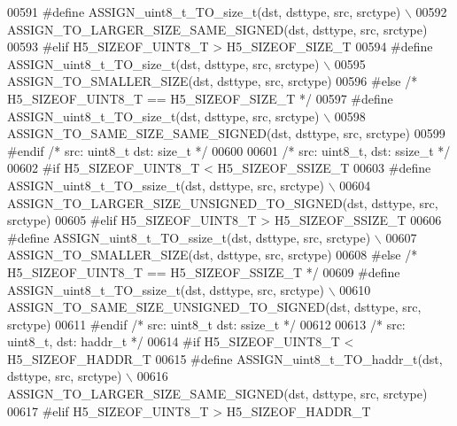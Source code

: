 \begin{DoxyCode}
00591 \textcolor{preprocessor}{    #define ASSIGN\_uint8\_t\_TO\_size\_t(dst, dsttype, src, srctype) \(\backslash\)}
00592 \textcolor{preprocessor}{        ASSIGN\_TO\_LARGER\_SIZE\_SAME\_SIGNED(dst, dsttype, src, srctype)}
00593 \textcolor{preprocessor}{#elif H5\_SIZEOF\_UINT8\_T > H5\_SIZEOF\_SIZE\_T}
00594 \textcolor{preprocessor}{    #define ASSIGN\_uint8\_t\_TO\_size\_t(dst, dsttype, src, srctype) \(\backslash\)}
00595 \textcolor{preprocessor}{        ASSIGN\_TO\_SMALLER\_SIZE(dst, dsttype, src, srctype)}
00596 \textcolor{preprocessor}{#else }\textcolor{comment}{/* H5\_SIZEOF\_UINT8\_T == H5\_SIZEOF\_SIZE\_T */}\textcolor{preprocessor}{}
00597 \textcolor{preprocessor}{    #define ASSIGN\_uint8\_t\_TO\_size\_t(dst, dsttype, src, srctype) \(\backslash\)}
00598 \textcolor{preprocessor}{        ASSIGN\_TO\_SAME\_SIZE\_SAME\_SIGNED(dst, dsttype, src, srctype)}
00599 \textcolor{preprocessor}{#endif }\textcolor{comment}{/* src: uint8\_t dst: size\_t */}\textcolor{preprocessor}{}
00600 
00601 \textcolor{comment}{/* src: uint8\_t, dst: ssize\_t */}
00602 \textcolor{preprocessor}{#if H5\_SIZEOF\_UINT8\_T < H5\_SIZEOF\_SSIZE\_T}
00603 \textcolor{preprocessor}{    #define ASSIGN\_uint8\_t\_TO\_ssize\_t(dst, dsttype, src, srctype) \(\backslash\)}
00604 \textcolor{preprocessor}{        ASSIGN\_TO\_LARGER\_SIZE\_UNSIGNED\_TO\_SIGNED(dst, dsttype, src, srctype)}
00605 \textcolor{preprocessor}{#elif H5\_SIZEOF\_UINT8\_T > H5\_SIZEOF\_SSIZE\_T}
00606 \textcolor{preprocessor}{    #define ASSIGN\_uint8\_t\_TO\_ssize\_t(dst, dsttype, src, srctype) \(\backslash\)}
00607 \textcolor{preprocessor}{        ASSIGN\_TO\_SMALLER\_SIZE(dst, dsttype, src, srctype)}
00608 \textcolor{preprocessor}{#else }\textcolor{comment}{/* H5\_SIZEOF\_UINT8\_T == H5\_SIZEOF\_SSIZE\_T */}\textcolor{preprocessor}{}
00609 \textcolor{preprocessor}{    #define ASSIGN\_uint8\_t\_TO\_ssize\_t(dst, dsttype, src, srctype) \(\backslash\)}
00610 \textcolor{preprocessor}{        ASSIGN\_TO\_SAME\_SIZE\_UNSIGNED\_TO\_SIGNED(dst, dsttype, src, srctype)}
00611 \textcolor{preprocessor}{#endif }\textcolor{comment}{/* src: uint8\_t dst: ssize\_t */}\textcolor{preprocessor}{}
00612 
00613 \textcolor{comment}{/* src: uint8\_t, dst: haddr\_t */}
00614 \textcolor{preprocessor}{#if H5\_SIZEOF\_UINT8\_T < H5\_SIZEOF\_HADDR\_T}
00615 \textcolor{preprocessor}{    #define ASSIGN\_uint8\_t\_TO\_haddr\_t(dst, dsttype, src, srctype) \(\backslash\)}
00616 \textcolor{preprocessor}{        ASSIGN\_TO\_LARGER\_SIZE\_SAME\_SIGNED(dst, dsttype, src, srctype)}
00617 \textcolor{preprocessor}{#elif H5\_SIZEOF\_UINT8\_T > H5\_SIZEOF\_HADDR\_T}

\end{DoxyCode}
